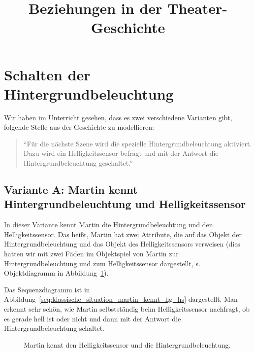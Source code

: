 \documentclass[11pt, a4paper]{scrartcl}
\title{Beziehungen in der Theater-Geschichte}
\begin{document}

\section*{Schalten der Hintergrundbeleuchtung}

Wir haben im Unterricht gesehen, dass es zwei verschiedene Varianten gibt, folgende Stelle aus der Geschichte zu modellieren:
\begin{quote}
\enquote{Für die nächste Szene wird die spezielle Hintergrundbeleuchtung aktiviert. Dazu wird ein Helligkeitssensor befragt und mit der Antwort die Hintergrundbeleuchtung geschaltet.}
\end{quote}

\subsection*{Variante A: Martin kennt Hintergrundbeleuchtung und Helligkeitssensor}

In dieser Variante kennt Martin die Hintergrundbeleuchtung und den Helligkeitssensor. Das heißt, Martin hat zwei Attribute, die auf das Objekt der Hintergrundbeleuchtung und das Objekt des Helligkeitssensors verweisen (dies hatten wir mit zwei Fäden im Objektspiel von Martin zur Hintergrundbeleuchtung und zum Helligkeitssensor dargestellt, s. Objektdiagramm in Abbildung~\ref{fig:martin_kennt_hg_hs}).

Das Sequenzdiagramm ist in Abbildung~\ref{seq:klassische_situation_martin_kennt_hg_hs} dargestellt. Man erkennt sehr schön, wie Martin selbstständig beim Helligkeitssensor nachfragt, ob es gerade hell ist oder nicht und dann mit der Antwort die Hintergrundbeleuchtung schaltet.


\hfill
\begin{figure}[H]
\centering
{}
\caption{Martin kennt den Helligkeitssensor und die Hintergrundbeleuchtung.}
\label{fig:martin_kennt_hg_hs}
\end{figure}
\end{document}
